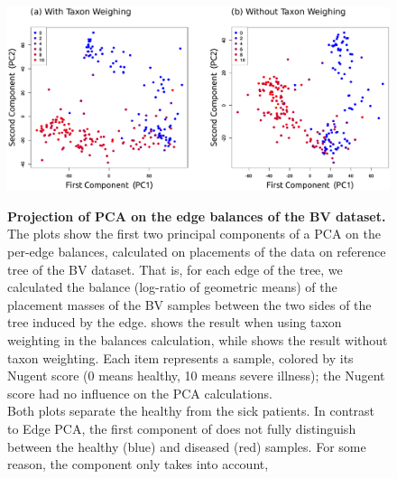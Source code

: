 \begin{figure}[!htb]
    \centering
    \includegraphics[width=\linewidth]{pdf/bv_place_edge_balances_pca_scatter.pdf}
    \begin{subfigure}{0pt}
        \label{fig:bv_place_edge_balances_pca_scatter:sub:with_taxon_weighting}
    \end{subfigure}
    \begin{subfigure}{0pt}
        \label{fig:bv_place_edge_balances_pca_scatter:sub:without_taxon_weighting}
    \end{subfigure}
    \caption{
        \textbf{Projection of PCA on the edge balances of the \ac{BV} dataset.}
        The plots show the first two principal components of a PCA on the per-edge balances,
        calculated on placements of the data on reference tree of the \ac{BV} dataset.
        That is, for each edge of the tree, we calculated the balance (log-ratio of geometric means)
        of the placement masses of the \ac{BV} samples between the two sides of the tree induced by the edge.
         shows the result when
        using taxon weighting \cite{Silverman2017} in the balances calculation,
        while  shows the result
        without taxon weighting.
        Each item represents a sample, colored by its Nugent score (0 means healthy, 10 means severe illness);
        the Nugent score had no influence on the PCA calculations.
        \\
        Both plots separate the healthy from the sick patients.
        In contrast to Edge PCA, the first component of
        does not fully distinguish between the healthy (blue) and diseased (red) samples.
        For some reason, the component only takes  into account,
}
\end{figure}
